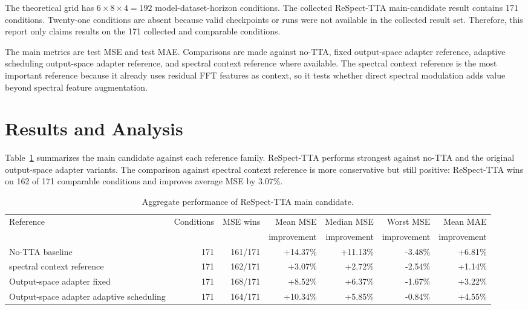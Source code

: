 \documentclass[10pt]{article}
\begin{document}
The theoretical grid has \(6 \times 8 \times 4 = 192\) model-dataset-horizon conditions. The collected ReSpect-TTA main-candidate result contains 171 conditions. Twenty-one conditions are absent because valid checkpoints or runs were not available in the collected result set. Therefore, this report only claims results on the 171 collected and comparable conditions.

The main metrics are test MSE and test MAE. Comparisons are made against no-TTA, fixed output-space adapter reference, adaptive scheduling output-space adapter reference, and spectral context reference where available. The spectral context reference is the most important reference because it already uses residual FFT features as context, so it tests whether direct spectral modulation adds value beyond spectral feature augmentation.

\section{Results and Analysis}

Table~\ref{tab:aggregate} summarizes the main candidate against each reference family. ReSpect-TTA performs strongest against no-TTA and the original output-space adapter variants. The comparison against spectral context reference is more conservative but still positive: ReSpect-TTA wins on 162 of 171 comparable conditions and improves average MSE by 3.07\%.

\begin{table}[h]
\centering
\small
\caption{Aggregate performance of ReSpect-TTA main candidate.}
\label{tab:aggregate}
\begin{tabular}{lrrrrrr}
\toprule
Reference & Conditions & MSE wins & Mean MSE & Median MSE & Worst MSE & Mean MAE \\
 & & & improvement & improvement & improvement & improvement \\
\midrule
No-TTA baseline & 171 & 161/171 & +14.37\% & +11.13\% & -3.48\% & +6.81\% \\
spectral context reference & 171 & 162/171 & +3.07\% & +2.72\% & -2.54\% & +1.14\% \\
Output-space adapter fixed & 171 & 168/171 & +8.52\% & +6.37\% & -1.67\% & +3.22\% \\
Output-space adapter adaptive scheduling & 171 & 164/171 & +10.34\% & +5.85\% & -0.84\% & +4.55\% \\
\bottomrule
\end{tabular}
\end{table}
\end{document}
